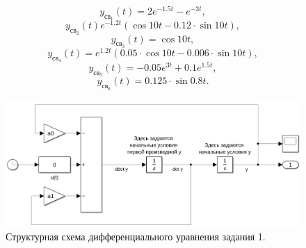 \begin{equation}
    \label{eq:11}
    y_{\text{св}_1}(t)=2e^{-1.5t}-e^{-3t},
\end{equation}
\begin{equation}
    \label{eq:12}
    y_{\text{св}_2}(t)e^{-1.2t}(\cos 10t-0.12\cdot\sin 10t),
\end{equation}
\begin{equation}
    \label{eq:13}
    y_{\text{св}_3}(t)=\cos10t,
\end{equation}
\begin{equation}
    \label{eq:14}
    y_{\text{св}_4}(t)=e^{1.2t}(0.05\cdot\cos10t-0.006\cdot\sin10t),
\end{equation}
\begin{equation}
    \label{eq:15}
    y_{\text{св}_5}(t)=-0.05e^{3t}+0.1e^{1.5t},
\end{equation}
\begin{equation}
    \label{eq:16}
    y_{\text{св}_6}(t)=0.125\cdot\sin0.8t.
\end{equation}

\begin{figure}
    \centering
    \includegraphics[width=1\textwidth]{figs/task_1_slx.png}
    \caption{Структурная схема дифференциального уравнения задания 1.}
    \label{fig:task_1_slx}
\end{figure}
    
